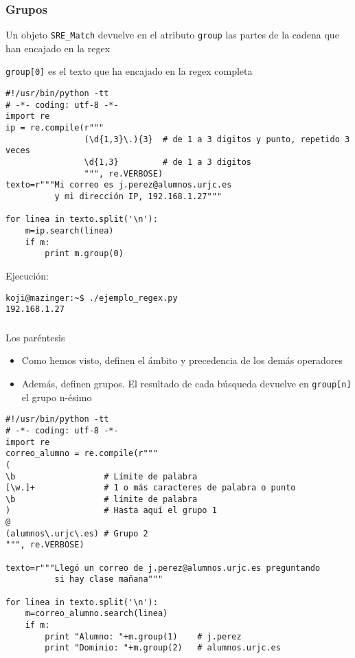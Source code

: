 \documentclass[ucs]{beamer}
\begin{document}
\begin{frame}[fragile]
\frametitle{Grupos}
Un objeto \verb|SRE_Match| devuelve en el atributo \verb|group| las
partes de la cadena que han encajado en la regex

\verb|group[0]| es el texto que ha encajado en la regex completa

  \begin{scriptsize}
  \begin{verbatim}
#!/usr/bin/python -tt
# -*- coding: utf-8 -*-
import re
ip = re.compile(r"""
                (\d{1,3}\.){3}  # de 1 a 3 digitos y punto, repetido 3 veces
                \d{1,3}         # de 1 a 3 digitos
                """, re.VERBOSE)
texto=r"""Mi correo es j.perez@alumnos.urjc.es 
          y mi dirección IP, 192.168.1.27"""

for linea in texto.split('\n'):
    m=ip.search(linea)
    if m:
        print m.group(0)
  \end{verbatim}
  \end{scriptsize}
Ejecución:
  \begin{scriptsize}
  \begin{verbatim}
koji@mazinger:~$ ./ejemplo_regex.py 
192.168.1.27
  \end{verbatim}
  \end{scriptsize}
\end{frame}


\begin{frame}[fragile]
\frametitle{}
Los paréntesis
\begin{itemize}
\item
Como hemos visto, definen el ámbito y precedencia de los demás operadores
\item
Además, definen grupos. El resultado de cada búsqueda devuelve en
\verb|group[n]| el grupo n-ésimo
\end{itemize}
\end{frame}

\begin{frame}[fragile]

  \begin{footnotesize}
  \begin{verbatim}
#!/usr/bin/python -tt
# -*- coding: utf-8 -*-
import re
correo_alumno = re.compile(r"""
(
\b                  # Límite de palabra
[\w.]+              # 1 o más caracteres de palabra o punto
\b                  # límite de palabra
)                   # Hasta aquí el grupo 1
@
(alumnos\.urjc\.es) # Grupo 2
""", re.VERBOSE)

texto=r"""Llegó un correo de j.perez@alumnos.urjc.es preguntando
          si hay clase mañana"""

for linea in texto.split('\n'):
    m=correo_alumno.search(linea)
    if m:
        print "Alumno: "+m.group(1)    # j.perez
        print "Dominio: "+m.group(2)   # alumnos.urjc.es
  \end{verbatim}
  \end{footnotesize}
\end{frame}
\end{document}

